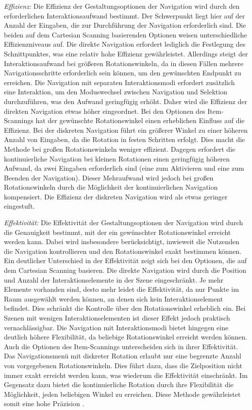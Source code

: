 \textit{Effizienz:}
Die Effizienz der Gestaltungsoptionen der Navigation wird durch den erforderlichen Interaktionsaufwand bestimmt. Der Schwerpunkt liegt hier auf der Anzahl der Eingaben, die zur Durchführung der Navigation erforderlich sind. Die beiden auf dem Cartesian Scanning basierenden Optionen weisen unterschiedliche Effizienzniveaus auf. Die direkte Navigation erfordert lediglich die Festlegung des Schnittpunktes, was eine relativ hohe Effizienz gewährleistet. Allerdings steigt der Interaktionsaufwand bei größeren Rotationswinkeln, da in diesen Fällen mehrere Navigationsschritte erforderlich sein können, um den gewünschten Endpunkt zu erreichen. Die Navigation mit separaten Interaktionsmodi erfordert zusätzlich eine Interaktion, um den Moduswechsel zwischen Navigation und Selektion durchzuführen, was den Aufwand geringfügig erhöht. Daher wird die Effizienz der direkten Navigation etwas höher eingeordnet. 
Bei den Optionen des Item-Scannings hat der gewünschte Rotationswinkel einen erheblichen Einfluss auf die Effizienz. Bei der diskreten Navigation führt ein größerer Winkel zu einer höheren Anzahl von Eingaben, da die Rotation in festen Schritten erfolgt. Dies macht die Methode bei großen Rotationswinkeln weniger effizient. Dagegen erfordert die kontinuierliche Navigation bei kleinen Rotationen einen geringfügig höheren Aufwand, da zwei Eingaben erforderlich sind (eine zum Aktivieren und eine zum Beenden der Navigation). Dieser Mehraufwand wird jedoch bei großen Rotationswinkeln durch die Möglichkeit der kontinuierlichen Navigation kompensiert. Die Effizienz der diskreten Navigation wird als etwas geringer eingestuft.

\textit{Effektivität:}
Die Effektivität der Gestaltungsoptionen der Navigation wird durch die Genauigkeit bestimmt, mit der ein gewünschter Rotationswinkel erreicht werden kann. Dabei wird insbesondere berücksichtigt, inwieweit die Nutzenden die Navigation kontrollieren und den Rotationswinkel exakt bestimmen können. 
Ein deutlicher Unterschied in der Effektivität zeigt sich bei den Optionen, die auf dem Cartesian Scanning basieren. Die direkte Navigation wird durch die Position und Anzahl der Interaktionselemente in der Szene eingeschränkt. Je mehr Elemente vorhanden sind, desto mehr leidet die Effektivität, da nur Punkte im Raum ausgewählt werden können, an denen sich kein Interaktionselement befindet. Dies schränkt die Kontrolle über den Rotationswinkel erheblich ein. Bei Szenen mit wenigen Interaktionselementen ist dieser Effekt jedoch praktisch vernachlässigbar. Die Navigation mit Interaktionsmodi bietet hingegen eine deutlich höhere Flexibilität, da beliebige Rotationswinkel erreicht werden können.
Auch die Optionen des Item-Scannings unterscheiden sich in ihrer Effektivität. Das Navigationsmenü mit diskreter Rotation erlaubt nur eine begrenzte Anzahl von vorgegebenen Rotationswinkeln. Dies führt dazu, dass die Zielposition nicht immer exakt erreicht werden kann, was wiederum die Effektivität einschränkt. Im Gegensatz dazu bietet die kontinuierliche Rotation durch ihre Flexibilität die Möglichkeit, jeden beliebigen Winkel zu erreichen. Diese Methode gewährleistet somit eine hohe Präzision \citep{10.1145/2159365.2159386}. 

